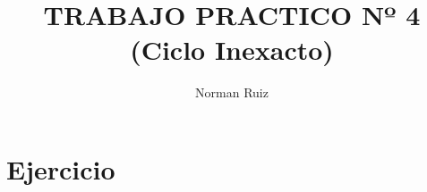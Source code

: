 \documentclass[12pt,a4paper,twoside]{article}
\author{Norman Ruiz}
\title{TRABAJO PRACTICO \linebreak Nº 4 \linebreak (Ciclo Inexacto)}
\begin{document}
\maketitle
\newpage

\tableofcontents
\newpage

\section{Ejercicio }

\hspace*{1cm}

\newpage
\end{document}
